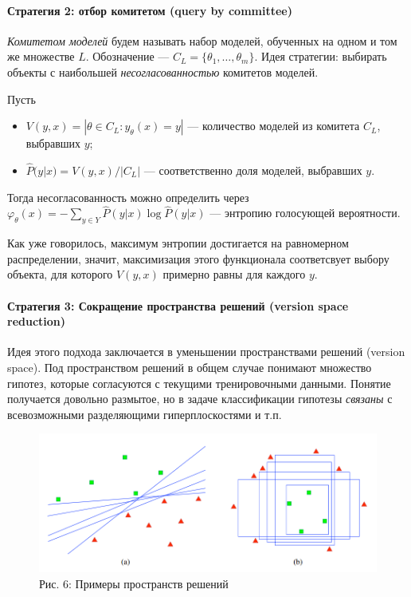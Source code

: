 \documentclass[]{article}
\let\oldparagraph\paragraph
\renewcommand{\paragraph}[1]{\oldparagraph{#1}\mbox{}}
\begin{document}
\paragraph{Стратегия 2: отбор комитетом (query by
committee)}\label{ux441ux442ux440ux430ux442ux435ux433ux438ux44f-2-ux43eux442ux431ux43eux440-ux43aux43eux43cux438ux442ux435ux442ux43eux43c-query-by-committee}

\emph{Комитетом моделей} будем называть набор моделей, обученных на
одном и том же множестве \(L\). Обозначение ---
\(C_L = \{\theta_1,\ldots,\theta_m\}\). Идея стратегии: выбирать объекты
с наибольшей \emph{несогласованностью} комитетов моделей.

Пусть

\begin{itemize}
\item
  \(V(y, x) = |{\theta \in C_{L}: y_{\theta}(x) = y}|\) --- количество
  моделей из комитета \(C_{L}\), выбравших \(y\);
\item
  \(\hat{P}(y|x) = V(y, x) / |C_{L}|\) --- соответственно доля моделей,
  выбравших \(y\).
\end{itemize}

Тогда несогласованность можно определить через
\(\varphi_{\theta}(x) = - \sum_{y \in Y} \hat{P}(y|x) \log \hat{P}(y|x)\)
--- энтропию голосующей вероятности.

Как уже говорилось, максимум энтропии достигается на равномерном
распределении, значит, максимизация этого функционала соответсвует
выбору объекта, для которого \(V(y, x)\) примерно равны для каждого
\(y\).

\paragraph{Стратегия 3: Сокращение пространства решений (version space
reduction)}\label{ux441ux442ux440ux430ux442ux435ux433ux438ux44f-3-ux441ux43eux43aux440ux430ux449ux435ux43dux438ux435-ux43fux440ux43eux441ux442ux440ux430ux43dux441ux442ux432ux430-ux440ux435ux448ux435ux43dux438ux439-version-space-reduction}

Идея этого подхода заключается в уменьшении пространствами решений
(version space). Под пространством решений в общем случае понимают
множество гипотез, которые согласуются с текущими тренировочными
данными. Понятие получается довольно размытое, но в задаче классификации
гипотезы \emph{связаны} с всевозможными разделяющими гиперплоскостями и
т.п.

\begin{figure}[htbp]
\centering
\includegraphics[width=6.87500in]{img/vs.png}
\caption{Рис. 6: Примеры пространств решений}
\end{figure}
\end{document}
